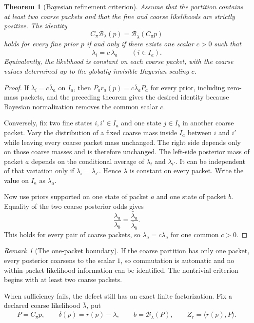\documentclass[11pt,letterpaper]{article}
\newtheorem{theorem}{Theorem}[section]
\theoremstyle{plain}
\theoremstyle{plain}
\theoremstyle{plain}
\theoremstyle{definition}
\theoremstyle{definition}
\theoremstyle{definition}
\theoremstyle{definition}
\theoremstyle{definition}
\theoremstyle{remark}
\theoremstyle{remark}
\newtheorem{remark}[remark]{Remark}
\theoremstyle{remark}
\theoremstyle{remark}
\theoremstyle{remark}
\newcommand{\cB}{\mathcal B}
\theoremstyle{remark}
\let\KomorebiPrimitiveMathcal\mathcal
\renewcommand{\mathcal}[1]{{\KomorebiPrimitiveMathcal{#1}}}
\begin{document}
\begin{theorem}[Bayesian refinement criterion]\label{core:record:021}
Assume that the partition contains at least two coarse packets and that the fine and coarse likelihoods are strictly positive.  The identity
\[
\boxed{
C_\pi\cB_\lambda(p)
=
\cB_{\bar\lambda}(C_\pi p)}
\]
holds for every fine prior $p$ if and only if there exists one scalar $c>0$ such that
\[
\boxed{
\lambda_i=c\,\bar\lambda_a
\qquad(i\in I_a).}
\]
Equivalently, the likelihood is constant on each coarse packet, with the coarse values determined up to the globally invisible Bayesian scaling $c$.
\end{theorem}

\begin{proof}
If $\lambda_i=c\bar\lambda_a$ on $I_a$, then $P_a r_a(p)=c\bar\lambda_aP_a$ for every prior, including zero-mass packets, and the preceding theorem gives the desired identity because Bayesian normalization removes the common scalar $c$.

Conversely, fix two fine states $i,i'\in I_a$ and one state $j\in I_b$ in another coarse packet.  Vary the distribution of a fixed coarse mass inside $I_a$ between $i$ and $i'$ while leaving every coarse packet mass unchanged.  The right side depends only on those coarse masses and is therefore unchanged.  The left-side posterior mass of packet $a$ depends on the conditional average of $\lambda_i$ and $\lambda_{i'}$.  It can be independent of that variation only if $\lambda_i=\lambda_{i'}$.  Hence $\lambda$ is constant on every packet. Write the value on $I_a$ as $\lambda_a$.

Now use priors supported on one state of packet $a$ and one state of packet $b$.  Equality of the two coarse posterior odds gives
\[
\frac{\lambda_a}{\lambda_b}
=
\frac{\bar\lambda_a}{\bar\lambda_b}.
\]
This holds for every pair of coarse packets, so $\lambda_a=c\bar\lambda_a$ for one common $c>0$.
\end{proof}

\begin{remark}[The one-packet boundary]\label{core:record:022}
If the coarse partition has only one packet, every posterior coarsens to the scalar $1$, so commutation is automatic and no within-packet likelihood information can be identified.  The nontrivial criterion begins with at least two coarse packets.
\end{remark}

When sufficiency fails, the defect still has an exact finite factorization.  Fix a declared coarse likelihood $\bar\lambda$, put
\[
P=C_\pi p,
\qquad
\delta(p)=r(p)-\bar\lambda,
\qquad
\bar b=\cB_{\bar\lambda}(P),
\qquad
Z_r=\langle r(p),P\rangle.
\]
\end{document}
